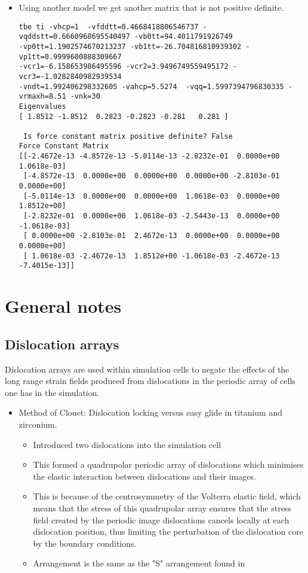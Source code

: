\documentclass[11pt]{article}
\begin{document}
\begin{itemize}
\item Using another model we get another matrix that is not positive
definite. 
\begin{verbatim}
tbe ti -vhcp=1  -vfddtt=0.4668418806546737 -vqddstt=0.6660968695540497 -vb0tt=94.4011791926749 
-vp0tt=1.1902574670213237 -vb1tt=-26.704816810939302 -vp1tt=0.9999600888309667 
-vcr1=-6.158653986495596 -vcr2=3.9496749559495172 -vcr3=-1.0282840982939534 
-vndt=1.992406298332605 -vahcp=5.5274  -vqq=1.5997394796830335 -vrmaxh=8.51 -vnk=30 
Eigenvalues
[ 1.8512 -1.8512  0.2823 -0.2823 -0.281   0.281 ]

 Is force constant matrix positive definite? False
Force Constant Matrix
[[-2.4672e-13 -4.8572e-13 -5.0114e-13 -2.8232e-01  0.0000e+00  1.0618e-03]
 [-4.8572e-13  0.0000e+00  0.0000e+00  0.0000e+00 -2.8103e-01  0.0000e+00]
 [-5.0114e-13  0.0000e+00  0.0000e+00  1.0618e-03  0.0000e+00  1.8512e+00]
 [-2.8232e-01  0.0000e+00  1.0618e-03 -2.5443e-13  0.0000e+00 -1.0618e-03]
 [ 0.0000e+00 -2.8103e-01  2.4672e-13  0.0000e+00  0.0000e+00  0.0000e+00]
 [ 1.0618e-03 -2.4672e-13  1.8512e+00 -1.0618e-03 -2.4672e-13 -7.4015e-13]]
\end{verbatim}
\end{itemize}


\section{General notes}
\label{sec-2}
\subsection{Dislocation arrays}
\label{sec-2-1}
Dislocation arrays are used within simulation cells to negate the effects of
the long range strain fields produced from dislocations in the periodic array
of cells one has in the simulation.
\begin{itemize}
\item Method of Clouet: Dislocation locking versus easy glide in titanium and
zirconium. \cite{Clouet2015}
\begin{itemize}
\item Introduced two dislocations into the simulation cell
\item This formed a quadrupolar periodic array of dislocations which
minimises the elastic interaction between dislocations and their
images.
\item This is because of the centrosymmetry of the Volterra elastic field,
which means that the stress of this quadrupolar array ensures that the
stress field created by the periodic image dislocations cancels locally
at each dislocation position, thus limiting the perturbation of the
dislocation core by the boundary conditions.
\item Arrangement is the same as the "S" arrangement found in
\cite{Clouet2012}
\end{itemize}
\end{itemize}
\end{document}
